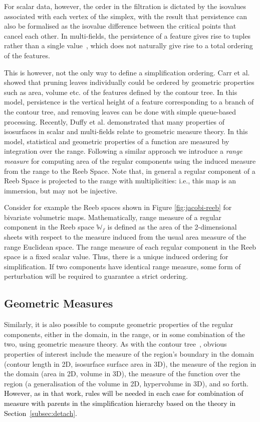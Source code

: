 \documentclass[twocolumn]{article}
\newcommand{\RS}{\mathbb{W}_f}
\newcommand{\figref}[1]{Figure \ref{fig:#1}}
\begin{document}
For scalar data, however, the order in the filtration is dictated by the isovalues associated with
each vertex of the simplex, with the result that persistence can also be formalised as the isovalue
difference between the critical points that cancel each other.  In multi-fields, the persistence of 
a feature gives rise to tuples rather than a single value~\cite{Carlsson-MultiVariatePersistence},
which does not naturally give rise to a total ordering of the features.


This is however, not the only way to define a simplification ordering.
Carr et al. \cite{CSv10} 
showed that pruning leaves individually could be ordered by geometric properties such as area, 
volume etc. of the features defined by the contour tree. In this model, persistence is the vertical
height of a feature corresponding to a branch of the contour tree, and removing leaves can be done
with simple queue-based processing.
Recently, Duffy et al. \cite{DCM13} demonstrated that many properties of isosurfaces in scalar 
and multi-fields relate to geometric measure theory. In this model, statistical and geometric 
properties of a function are measured by integration over the range.
Following a similar approach we introduce a \emph{range measure} for
computing area of the regular components using the induced measure
from the range to the  Reeb Space. Note that, in general a regular component of a Reeb Space
is projected to the range with multiplicities: i.e., this map is an
immersion, but may not be injective.


Consider for example the Reeb spaces shown in \figref{jacobi-reeb} for bivariate volumetric 
maps. Mathematically, range measure of a regular component in the Reeb space $\RS$ is
defined as the area of the 2-dimensional sheets with respect to the measure induced from the usual
area measure of the range Euclidean space. 
The range measure of each regular component in the Reeb space is a fixed scalar value. Thus,
there is a unique induced ordering for simplification. If two 
components have identical range measure, some form of perturbation will be required to guarantee a 
strict ordering. 





\subsection{Geometric Measures}
\label{sec:geomMeasures}
Similarly, it is also possible to compute geometric properties of the regular components, either
in the domain, in the range, or in some combination of the two, using
geometric measure theory. 
As with the contour tree~\cite{CSv10}, obvious properties of interest include the measure of the 
region's boundary in the domain (contour length in 2D, isosurface surface area in 3D), the measure
of the region in the domain (area in 2D, volume in 3D), the measure of the function over the region 
(a generalisation of the volume in 2D, hypervolume in 3D), and so forth.  \textcolor{black}{However, as in that work, 
rules will be needed in each case for combination of measure with parents in the simplification 
hierarchy based on the theory in Section~\ref{subsec:detach}.}  
\end{document}
